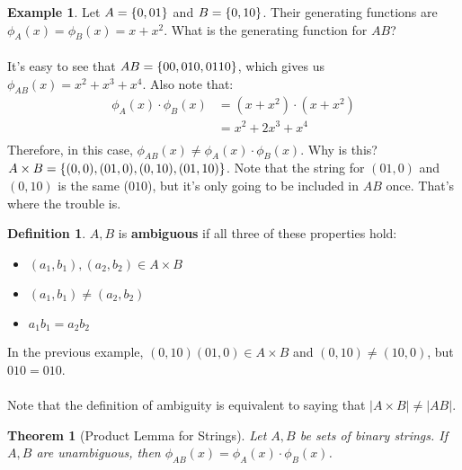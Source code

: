 \documentclass[]{article}
\newtheorem*{theorem}{Theorem}
\theoremstyle{definition}
\newtheorem*{defn}{Definition}
\newtheorem{ex}{Example}[section]
\newcommand{\lecture}[1]{\marginpar{{\footnotesize $\leftarrow$ \underline{#1}}}}
\DeclarePairedDelimiter{\set}{\lbrace}{\rbrace}
\begin{document}
			\begin{ex} \lecture{January 28, 2013}
				Let $A = \set{0, 01}$ and $B = \set{0, 10}$. Their generating functions are $\phi_A(x) = \phi_B(x) = x + x^2$. What is the generating function for $AB$?
				\\ \\
				It's easy to see that $AB = \set{00, 010, 0110}$, which gives us $\phi_{AB}(x) = x^2 + x^3 + x^4$. Also note that:
				\begin{align*}
					\phi_A(x) \cdot \phi_B(x) &= (x + x^2) \cdot (x + x^2) \\
					&= x^2 + 2x^3 + x^4 \\
				\end{align*}
				Therefore, in this case, $\phi_{AB}(x) \not = \phi_A(x) \cdot \phi_B(x)$. Why is this? $A \times B = \set{(0, 0), (01, 0), (0, 10), (01,10) }$. Note that the string for $(01, 0)$ and $(0, 10)$ is the same ($010$), but it's only going to be included in $AB$ once. That's where the trouble is.
			\end{ex}

			\begin{defn}
				$A, B$ is \textbf{ambiguous} if all three of these properties hold:
				\begin{itemize}
					\item $(a_1, b_1), (a_2, b_2) \in A \times B$
					\item $(a_1, b_1) \not = (a_2, b_2)$
					\item $a_1b_1 = a_2b_2$
				\end{itemize}
			\end{defn}
			In the previous example, $(0, 10) (01, 0) \in A \times B$ and $(0, 10) \not = (10, 0)$, but $010 = 010$.
			\\ \\
			Note that the definition of ambiguity is equivalent to saying that $|A \times B| \not = |AB|$.

			\begin{theorem}[Product Lemma for Strings]
				Let $A, B$ be sets of binary strings. If $A, B$ are unambiguous, then $\phi_{AB}(x) = \phi_A(x) \cdot \phi_B(x)$.
			\end{theorem}
\end{document}
